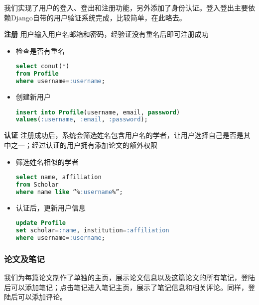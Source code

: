 我们实现了用户的登入、登出和注册功能，另外添加了身份认证。登入登出主要依赖Django自带的用户验证系统完成，比较简单，在此略去。

\noindent
{\bf 注册} 用户输入用户名邮箱和密码，经验证没有重名后即可注册成功
\begin{itemize}
\item 检查是否有重名
\begin{lstlisting}[language=SQL]
select conut(*)
from Profile
where username=:username;
\end{lstlisting}
\item 创建新用户
\begin{lstlisting}[language=SQL]
insert into Profile(username, email, password)
values(:username, :email, :password);
\end{lstlisting}
\end{itemize}
{\bf 认证} 注册成功后，系统会筛选姓名包含用户名的学者，让用户选择自己是否是其中之一；经过认证的用户拥有添加论文的额外权限
\begin{itemize}
\item 筛选姓名相似的学者
\begin{lstlisting}[language=SQL]
select name, affiliation
from Scholar
where name like “%:username%”;
\end{lstlisting}
\item 认证后，更新用户信息
\begin{lstlisting}[language=SQL]
update Profile
set scholar=:name, institution=:affiliation
where username=:username;
\end{lstlisting}
\end{itemize}

\subsubsection{论文及笔记}

我们为每篇论文制作了单独的主页，展示论文信息以及这篇论文的所有笔记，登陆后可以添加笔记；点击笔记进入笔记主页，展示了笔记信息和相关评论。同样，登陆后可以添加评论。

